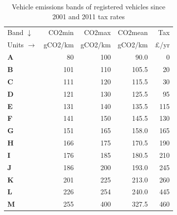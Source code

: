 \begin{table}[htbp]
\caption[Vehicle emissions bands of registered vehicles since 2001]
{Vehicle emissions bands of registered vehicles since 2001 and 2011 tax rates}
\begin{center}
\begin{tabular}{lrrrr}
\toprule
Band $\downarrow$ & CO2min & CO2max & CO2mean & Tax \\
Units $\rightarrow$ & gCO2/km & gCO2/km & gCO2/km & £/yr \\
\midrule
\textbf{A} & 80 & 100 & 90.0 & 0 \\
\textbf{B} & 101 & 110 & 105.5 & 20 \\
\textbf{C} & 111 & 120 & 115.5 & 30 \\
\textbf{D} & 121 & 130 & 125.5 & 95 \\
\textbf{E} & 131 & 140 & 135.5 & 115 \\
\textbf{F} & 141 & 150 & 145.5 & 130 \\
\textbf{G} & 151 & 165 & 158.0 & 165 \\
\textbf{H} & 166 & 175 & 170.5 & 190 \\
\textbf{I} & 176 & 185 & 180.5 & 210 \\
\textbf{J} & 186 & 200 & 193.0 & 245 \\
\textbf{K} & 201 & 225 & 213.0 & 260 \\
\textbf{L} & 226 & 254 & 240.0 & 445 \\
\textbf{M} & 255 & 400 & 327.5 & 460 \\
\bottomrule
\end{tabular}\end{center}
\label{ttaxrate}
\end{table}

